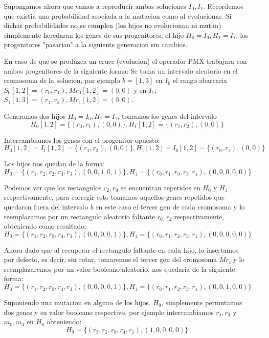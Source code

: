 \documentclass[10pt]{article}
\begin{document}

Supongamos ahora que vamos a reproducir ambas soluciones $I_0,I_1$. Recordemos que existia una probabilidad asociada a la mutacion como al evolucionar. Si dichas probabilidades no se cumplen (los hijos no evolucionan ni mutan) simplemente heredaran los genes de sus progenitores, el hijo $H_0 = I_0, H_1 = I_1$, los progenitores "pasarian" a la siguiente generacion sin cambios.

En caso de que se produzca un cruce (evolucion) el operador PMX trabajara con ambos progenitores de la siguiente forma: 
Se toma un intervalo aleatorio en el cromosoma de la solucion, por ejemplo $b = [1,3]$ en $I_0$ el rango abarcaria $S_0[1,2] = (r_0,r_1), Mr_0[1,2] = (0,0)$ y en $I_1$, $S_1[1,3] = (r_1,r_2), Mr_1[1,2] = (0,0)$.

Generamos dos hijos $H_0 = I_0, H_1 = I_1$, tomamos los genes del intervalo
$$H_0[1,2] = \{(r_0,r_1),(0,0)\}, H_1[1,2] = \{(r_1,r_2),(0,0)\}$$

Intercambiamos los genes con el progenitor opuesto:
$$H_0[1,2] = I_1[1,2] = \{(r_1,r_2),(0,0)\}, H_1[1,2] = I_0[1,2] = \{(r_0,r_1),(0,0)\}$$ 

Los hijos nos quedan de la forma: 
$$H_0=\{(r_1,r_2,r_2,r_4,r_3),(0,0,1,0,1)\}, H_1 = \{(r_0,r_1,r_0,r_3,r_4),(0,0,0,0,0)\}$$

Podemos ver que los rectangulos $r_2, r_0$ se encuentran repetidos en $H_0$ y $H_1$ respectivamente, para corregir esto tomamos aquellos genes repetidos que quedaron fuera del intervalo $b$ en este caso el tercer gen de cada cromosoma y lo reemplazamos por un rectangulo aleatorio faltante $r_0, r_2$ respectivamente, obteniendo como resultado:
$$H_0=\{(r_1,r_2,r_0,r_4,r_3),(0,0,0,0,1)\}, H_1 = \{(r_0,r_1,r_2,r_3,r_4),(0,0,0,0,0)\}$$

Ahora dado que al recuperar el rectangulo faltante en cada hijo, lo insertamos por defecto, es decir, sin rotar, tomaremos el tercer gen del cromosoma $Mr_i$ y lo reemplazaremos por un valor booleano aleatorio, nos quedaria de la siguiente forma:
$$H_0=\{(r_1,r_2,r_0,r_4,r_3),(0,0,0,0,1)\}, H_1 = \{(r_0,r_1,r_2,r_3,r_4),(0,0,1,0,0)\}$$

Suponiendo una mutacion en alguno de los hijos, $H_0$, simplemente permutamos dos genes y su valor booleano respectivo, por ejemplo intercambiamos $r_1,r_3$ y $m_0,m_4$ en $H_0$ obteniendo:
$$H_0=\{(r_3,r_2,r_0,r_4,r_1),(1,0,0,0,0)\}$$
\end{document}
